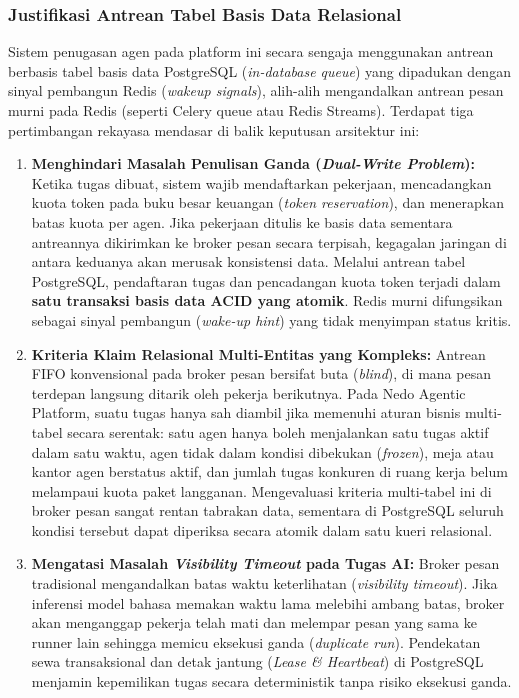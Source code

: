 \subsubsection{Justifikasi Antrean Tabel Basis Data Relasional}
Sistem penugasan agen pada platform ini secara sengaja menggunakan antrean berbasis tabel basis data PostgreSQL (\textit{in-database queue}) yang dipadukan dengan sinyal pembangun Redis (\textit{wakeup signals}), alih-alih mengandalkan antrean pesan murni pada Redis (seperti Celery queue atau Redis Streams). Terdapat tiga pertimbangan rekayasa mendasar di balik keputusan arsitektur ini:
\begin{enumerate}[label=\alph*.]
  \item \textbf{Menghindari Masalah Penulisan Ganda (\textit{Dual-Write Problem}):} Ketika tugas dibuat, sistem wajib mendaftarkan pekerjaan, mencadangkan kuota token pada buku besar keuangan (\textit{token reservation}), dan menerapkan batas kuota per agen. Jika pekerjaan ditulis ke basis data sementara antreannya dikirimkan ke broker pesan secara terpisah, kegagalan jaringan di antara keduanya akan merusak konsistensi data. Melalui antrean tabel PostgreSQL, pendaftaran tugas dan pencadangan kuota token terjadi dalam \textbf{satu transaksi basis data ACID yang atomik}. Redis murni difungsikan sebagai sinyal pembangun (\textit{wake-up hint}) yang tidak menyimpan status kritis.
  \item \textbf{Kriteria Klaim Relasional Multi-Entitas yang Kompleks:} Antrean FIFO konvensional pada broker pesan bersifat buta (\textit{blind}), di mana pesan terdepan langsung ditarik oleh pekerja berikutnya. Pada Nedo Agentic Platform, suatu tugas hanya sah diambil jika memenuhi aturan bisnis multi-tabel secara serentak: satu agen hanya boleh menjalankan satu tugas aktif dalam satu waktu, agen tidak dalam kondisi dibekukan (\textit{frozen}), meja atau kantor agen berstatus aktif, dan jumlah tugas konkuren di ruang kerja belum melampaui kuota paket langganan. Mengevaluasi kriteria multi-tabel ini di broker pesan sangat rentan tabrakan data, sementara di PostgreSQL seluruh kondisi tersebut dapat diperiksa secara atomik dalam satu kueri relasional.
  \item \textbf{Mengatasi Masalah \textit{Visibility Timeout} pada Tugas AI:} Broker pesan tradisional mengandalkan batas waktu keterlihatan (\textit{visibility timeout}). Jika inferensi model bahasa memakan waktu lama melebihi ambang batas, broker akan menganggap pekerja telah mati dan melempar pesan yang sama ke runner lain sehingga memicu eksekusi ganda (\textit{duplicate run}). Pendekatan sewa transaksional dan detak jantung (\textit{Lease \& Heartbeat}) di PostgreSQL menjamin kepemilikan tugas secara deterministik tanpa risiko eksekusi ganda.
\end{enumerate}

